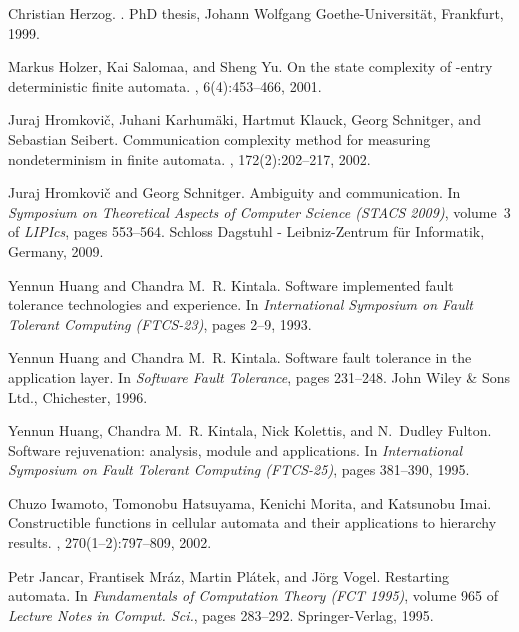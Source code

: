 \documentclass[copyright]{eptcs}
\begin{document}
\begin{thebibliography}{10}
Christian Herzog.
.
\newblock PhD thesis, Johann Wolfgang Goethe-Universit{\"a}t, Frankfurt, 1999.

Markus Holzer, Kai Salomaa, and Sheng Yu.
\newblock On the state complexity of -entry deterministic finite automata.
, 6(4):453--466, 2001.

Juraj Hromkovi{\v{c}}, Juhani Karhum{\"a}ki, Hartmut Klauck, Georg Schnitger,
  and Sebastian Seibert.
\newblock Communication complexity method for measuring nondeterminism in
  finite automata.
, 172(2):202--217, 2002.

Juraj Hromkovi{\v{c}} and Georg Schnitger.
\newblock Ambiguity and communication.
\newblock In {\em Symposium on Theoretical Aspects of Computer Science ({STACS}
  2009)}, volume~3 of {\em LIPIcs}, pages 553--564. Schloss Dagstuhl -
  Leibniz-Zentrum f{\"u}r Informatik, Germany, 2009.

Yennun Huang and Chandra M.~R. Kintala.
\newblock Software implemented fault tolerance technologies and experience.
\newblock In {\em International Symposium on Fault Tolerant Computing
  (FTCS-23)}, pages 2--9, 1993.

Yennun Huang and Chandra M.~R. Kintala.
\newblock Software fault tolerance in the application layer.
\newblock In {\em Software Fault Tolerance}, pages 231--248. John Wiley \& Sons
  Ltd., Chichester, 1996.

Yennun Huang, Chandra M.~R. Kintala, Nick Kolettis, and N.~Dudley Fulton.
\newblock Software rejuvenation: analysis, module and applications.
\newblock In {\em International Symposium on Fault Tolerant Computing
  (FTCS-25)}, pages 381--390, 1995.

Chuzo Iwamoto, Tomonobu Hatsuyama, Kenichi Morita, and Katsunobu Imai.
\newblock Constructible functions in cellular automata and their applications
  to hierarchy results.
, 270(1--2):797--809, 2002.

Petr Jancar, Frantisek Mr{\'a}z, Martin Pl{\'a}tek, and J{\"o}rg Vogel.
\newblock Restarting automata.
\newblock In {\em Fundamentals of Computation Theory (FCT 1995)}, volume 965 of
  {\em Lecture Notes in Comput. Sci.}, pages 283--292. Springer-Verlag, 1995.


\end{thebibliography}
\end{document}
